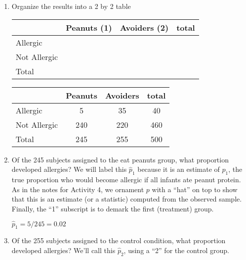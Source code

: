 \begin{enumerate}
  \item \label{PnutTable} Organize the results into a 2 by 2 table
\begin{students}

{\Large
    \begin{tabular}[c]{|l|c|c|c|} \hline
        &Peanuts (1) & Avoiders (2) & total \\ \hline
Allergic    &   &   & \\ \hline
Not Allergic&   &   & \\ \hline
Total & & & \\ \hline
    \end{tabular} 
}
\end{students}
\begin{key}

\begin{tabular}[c]{|l|c|c|c|} \hline
        &Peanuts & Avoiders & total \\ \hline
Allergic& 5  & 35  &  40\\ \hline
Not Allergic& 240  &  220 &460 \\ \hline
Total & 245  &  255 & 500\\ \hline
\end{tabular}
\end{key}

\item Of the 245 subjects assigned to the eat peanuts group, what proportion
  developed allergies? We will label this 
     $\widehat{p}_1$ because it is an estimate of $p_1$,  the true proportion
     who would become allergic if all infants ate peanut protein.  As
     in the notes for Activity 4,  we ornament $p$ with a ``hat'' on top to
     show that this is an estimate (or 
     a statistic) computed from the observed sample.  Finally, the ``1''
     subscript is to demark the first (treatment) group.
\begin{students}
\vspace{2cm}
\end{students}

\begin{key}
  {\it $\widehat{p}_1 = 5/245 = 0.02$ }
\end{key}



   \item  Of the 255 subjects assigned to the control condition, what
     proportion developed allergies? We'll call this $\widehat{p}_2$, using a ``2''
     for the control group. 
\begin{students}
\vspace{2cm}
\end{students}


\end{enumerate}
